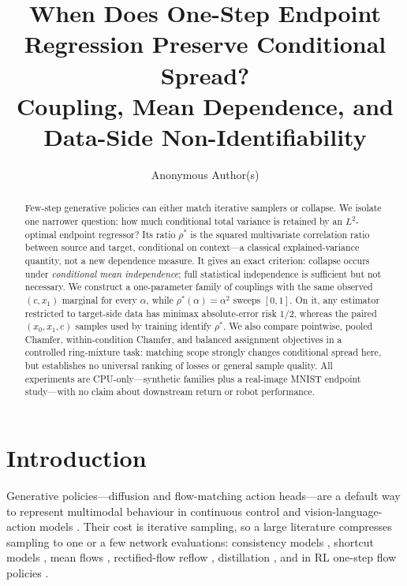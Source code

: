 \documentclass{article}
\title{When Does One-Step Endpoint Regression Preserve Conditional Spread?\\
Coupling, Mean Dependence, and Data-Side Non-Identifiability}
\author{Anonymous Author(s)}
\theoremstyle{plain}
\begin{document}
\maketitle

\begin{abstract}
Few-step generative policies can either match iterative samplers or collapse. We isolate
one narrower question: how much conditional total variance is retained by an
$L^2$-optimal endpoint regressor? Its ratio $\rho^\ast$ is the squared multivariate
correlation ratio between source and target, conditional on context---a classical
explained-variance quantity, not a new dependence measure. It gives an exact criterion:
collapse occurs under \emph{conditional mean independence}; full statistical independence
is sufficient but not necessary. We construct a one-parameter family of couplings with the
same observed $(c,x_1)$ marginal for every $\alpha$, while $\rho^\ast(\alpha)=\alpha^2$
sweeps $[0,1]$. On it, any estimator restricted to target-side data has minimax
absolute-error risk $1/2$, whereas the paired $(x_0,x_1,c)$ samples used by training
identify $\rho^\ast$. We also compare pointwise, pooled Chamfer, within-condition Chamfer,
and balanced assignment objectives in a controlled ring-mixture task: matching scope
strongly changes conditional spread here, but establishes no universal ranking of losses
or general sample quality. All experiments are CPU-only---synthetic families plus a
real-image MNIST endpoint study---with no claim about downstream return or robot
performance.
\end{abstract}

\section{Introduction}
\label{sec:intro}

Generative policies---diffusion and flow-matching action heads---are a default way to
represent multimodal behaviour in continuous control and vision-language-action models
\citep{chi2023diffusionpolicy,wang2023diffusionql}. Their cost is iterative sampling,
so a large literature compresses sampling to one or a few network evaluations:
consistency models \citep{song2023consistency}, shortcut models
\citep{frans2024shortcut}, mean flows \citep{geng2025meanflows}, rectified-flow reflow
\citep{liu2023rectifiedflow}, distillation \citep{salimans2022progressivedistill,
yin2024dmd}, and in RL one-step flow policies \citep{nguyen2026bfq,li2026ofp,mvp2026}.
\end{document}
